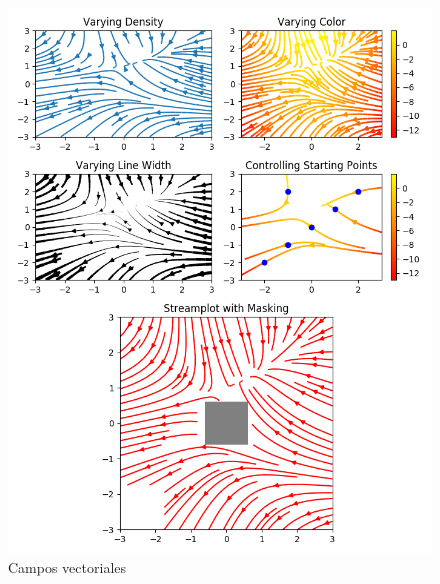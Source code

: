 \begin{frame}
\begin{figure}
{	\includegraphics[scale=0.25]{Imagenes/sphx_glr_plot_streamplot_001.png}
	\caption{Campos vectoriales}
	}
\end{figure}
\end{frame}
